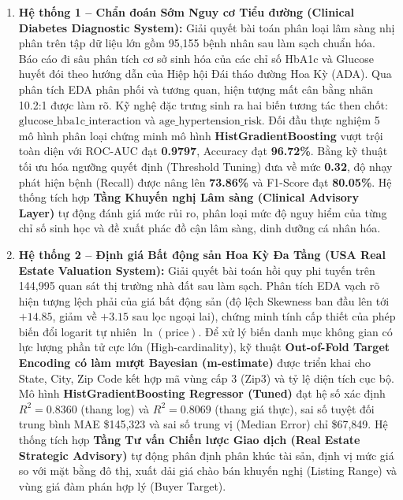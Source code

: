 \documentclass[12pt,a4paper]{report}
\begin{document}
\begin{enumerate}[leftmargin=2em]
    \item \textbf{Hệ thống 1 -- Chẩn đoán Sớm Nguy cơ Tiểu đường (Clinical Diabetes Diagnostic System):} 
    Giải quyết bài toán phân loại lâm sàng nhị phân trên tập dữ liệu lớn gồm 95,155 bệnh nhân sau làm sạch chuẩn hóa. Báo cáo đi sâu phân tích cơ sở sinh hóa của các chỉ số HbA1c và Glucose huyết đói theo hướng dẫn của Hiệp hội Đái tháo đường Hoa Kỳ (ADA). Qua phân tích EDA phân phối và tương quan, hiện tượng mất cân bằng nhãn 10.2:1 được làm rõ. Kỹ nghệ đặc trưng sinh ra hai biến tương tác then chốt: $\text{glucose\_hba1c\_interaction}$ và $\text{age\_hypertension\_risk}$. Đối đầu thực nghiệm 5 mô hình phân loại chứng minh mô hình \textbf{HistGradientBoosting} vượt trội toàn diện với ROC-AUC đạt \textbf{0.9797}, Accuracy đạt \textbf{96.72\%}. Bằng kỹ thuật tối ưu hóa ngưỡng quyết định (Threshold Tuning) đưa về mức \textbf{0.32}, độ nhạy phát hiện bệnh (Recall) được nâng lên \textbf{73.86\%} và F1-Score đạt \textbf{80.05\%}. Hệ thống tích hợp \textbf{Tầng Khuyến nghị Lâm sàng (Clinical Advisory Layer)} tự động đánh giá mức rủi ro, phân loại mức độ nguy hiểm của từng chỉ số sinh học và đề xuất phác đồ cận lâm sàng, dinh dưỡng cá nhân hóa.

    \item \textbf{Hệ thống 2 -- Định giá Bất động sản Hoa Kỳ Đa Tầng (USA Real Estate Valuation System):}
    Giải quyết bài toán hồi quy phi tuyến trên 144,995 quan sát thị trường nhà đất sau làm sạch. Phân tích EDA vạch rõ hiện tượng lệch phải của giá bất động sản (độ lệch Skewness ban đầu lên tới $+14.85$, giảm về $+3.15$ sau lọc ngoại lai), chứng minh tính cấp thiết của phép biến đổi logarit tự nhiên $\ln(\text{price})$. Để xử lý biến danh mục không gian có lực lượng phần tử cực lớn (High-cardinality), kỹ thuật \textbf{Out-of-Fold Target Encoding có làm mượt Bayesian (m-estimate)} được triển khai cho State, City, Zip Code kết hợp mã vùng cấp 3 (Zip3) và tỷ lệ diện tích cục bộ. Mô hình \textbf{HistGradientBoosting Regressor (Tuned)} đạt hệ số xác định $R^2 = 0.8360$ (thang log) và $R^2 = 0.8069$ (thang giá thực), sai số tuyệt đối trung bình MAE \$145,323 và sai số trung vị (Median Error) chỉ \$67,849. Hệ thống tích hợp \textbf{Tầng Tư vấn Chiến lược Giao dịch (Real Estate Strategic Advisory)} tự động phân định phân khúc tài sản, định vị mức giá so với mặt bằng đô thị, xuất dải giá chào bán khuyến nghị (Listing Range) và vùng giá đàm phán hợp lý (Buyer Target).


\end{enumerate}
\end{document}
